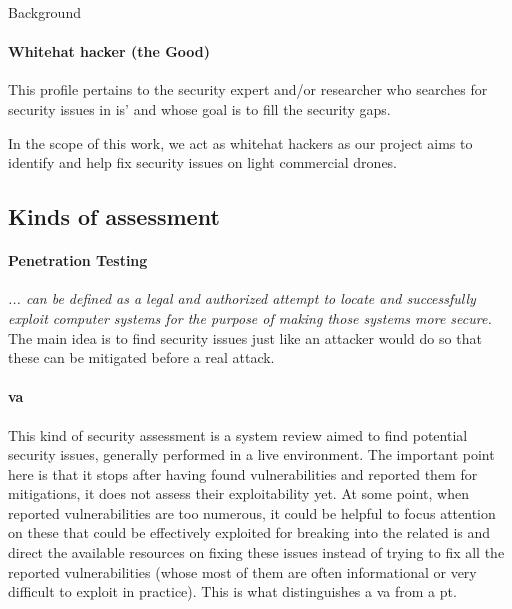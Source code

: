 \begin{chaptercover}{Background}
\paragraph{Whitehat hacker (the {\color{forestgreen(web)} Good})} This profile pertains to the security expert and/or researcher who searches for security issues in \acrshort{is}' and whose goal is to fill the security gaps.

\begin{tip}
In the scope of this work, we act as whitehat hackers as our project aims to identify and help fix security issues on light commercial drones.
\end{tip}

\subsection{Kinds of assessment}

\paragraph{Penetration Testing} \textit{... can be defined as a legal and authorized attempt to locate and successfully exploit computer systems for the purpose of making those systems more secure.} \cite{basics-of-hacking-and-pt} The main idea is to find security issues just like an attacker would do so that these can be mitigated before a real attack.

\paragraph{\acrfull{va}} This kind of security assessment is a system review aimed to find potential security issues, generally performed in a live environment. The important point here is that it stops after having found vulnerabilities and reported them for mitigations, it does not assess their exploitability yet. At some point, when reported vulnerabilities are too numerous, it could be helpful to focus attention on these that could be effectively exploited for breaking into the related \acrshort{is} and direct the available resources on fixing these issues instead of trying to fix all the reported vulnerabilities (whose most of them are often informational or very difficult to exploit in practice). This is what distinguishes a \acrlong{va} from a \acrlong{pt}.


\end{chaptercover}
